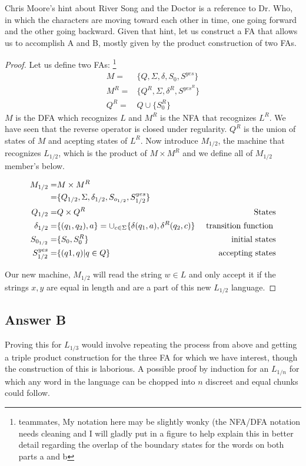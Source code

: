 \documentclass[titlepage]{article}\usepackage[]{graphicx}\usepackage[]{color}
\begin{document}
Chris Moore's hint about River Song and the Doctor is a reference to Dr. Who,
in which the characters are moving toward each other in time, one going
forward and the other going backward. Given that hint, let us construct a FA
that allows us to accomplish A and B, mostly given by the product construction
of two FAs.

\begin{proof}
	Let us define two FAs:
        \footnote{teammates, My notation here may be slightly wonky (the
          NFA/DFA notation needs cleaning and I will gladly
        put in a figure to help explain this in better detail regarding the overlap of
        the boundary states for the words on both parts a and b}
	\begin{align}
		M =& \{Q, \Sigma, \delta, S_0, S^{yes}\} \\
		M^R =& \{ Q^R, \Sigma, \delta^R, S^{yes^R} \} \\
		Q^R = & Q \cup \{S_{0}^R \}
	\end{align}
	$M$ is the DFA which recognizes $L$ and $M^R$ is the NFA that recognizes
	$L^R$. We have seen that the reverse operator is closed under
	regularity. $Q^R$ is the union of states of $M$ and acepting states of
	$L^R$.
        Now introduce $M_{1/2}$, the machine that recognizes $L_{1/2}$, which
        is the product of $M \times M^R$ and we define all of $M_{1/2}$
        member's below.
        
        \begin{align}
          M_{1/2} = & M \times M^R \\ = &  \{ Q_{1/2}, \Sigma, \delta_{1/2}, S_{o_{1/2}}, S_{1/2}^{yes}  \} & \\
          Q_{1/2} = & Q \times Q^R \hfill & \text{States} \\ 
          \delta_{1/2} = & \{ (q_1, q_2), a\} = \cup_{c \in \Sigma} \{ \delta (q_1, a), \delta^R (q_2, c)\} &\text{ transition function }\\ 
          S_{0_{1/2}} = & \{ S_0, S_0^R \} & \text{ initial states} \\
          S^{yes}_{1/2} = & \{ (q1,q) | q \in Q \} & \text{ accepting states}
	\end{align}

        Our new machine, $M_{1/2}$ will read the string $w \in L$ and only
        accept it if the strings $x,y$ are equal in length and are a part of
        this new $L_{1/2}$ language. 
\end{proof}

\subsection{Answer B}
Proving this for $L_{1/3}$ would involve repeating the process from above and
getting a triple product construction for the three FA for which we have
interest, though the construction of this is laborious. 
A possible proof by induction for an $L_{1/n}$ for which any word in the
language can be chopped into $n$ discreet and equal chunks could follow. 
\end{document}

